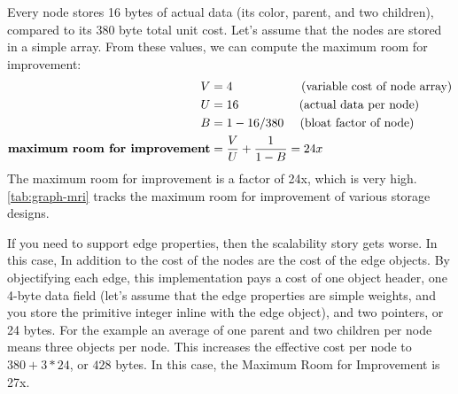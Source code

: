 Every node stores 16
bytes of actual data (its color, parent, and two children), compared to its 380
byte total unit cost. Let's assume that the nodes are stored in a simple array.
From these values, we can compute the maximum room for improvement:
\begin{align*}
V &= 4 ~~~~~~~~~~~~~~~~~\textrm{(variable cost of node array)}\\
U &= 16 ~~~~~~~~~~~~~~~\textrm{(actual data per node)}\\
B &= 1-16/380 ~~~~\textrm{(bloat factor of node)}\\
\textbf{\textrm{maximum room for improvement}} &= \frac{V}{U} + \frac{1}{1-B} =
24x
\end{align*}
The maximum room for improvement is a factor of 24x, which is very high.
\autoref{tab:graph-mri} tracks the maximum room for improvement of various
storage designs.

If you need to support edge properties, then the scalability story gets worse.
In this case, In addition to the cost of the nodes are the cost of the edge
objects. By objectifying each edge, this implementation pays a cost of one
object header, one 4-byte data field (let's assume that the edge properties are
simple weights, and you store the primitive integer inline with the edge
object), and two pointers, or 24 bytes. For the example an average of one parent
and two children per node means three  objects per node. This
increases the effective cost per node to $380 + 3*24$, or $428$ bytes. In this
case, the Maximum Room for Improvement is 27x.

